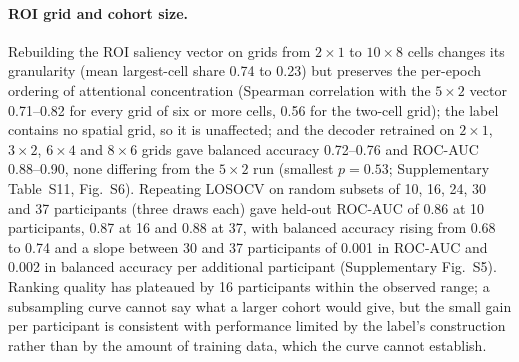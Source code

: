 \paragraph{ROI grid and cohort size.} Rebuilding the ROI saliency vector on grids from $2\times1$ to $10\times8$ cells changes its granularity (mean largest-cell share 0.74 to 0.23) but preserves the per-epoch ordering of attentional concentration (Spearman correlation with the $5\times2$ vector 0.71--0.82 for every grid of six or more cells, 0.56 for the two-cell grid); the label contains no spatial grid, so it is unaffected; and the decoder retrained on $2\times1$, $3\times2$, $6\times4$ and $8\times6$ grids gave balanced accuracy 0.72--0.76 and ROC-AUC 0.88--0.90, none differing from the $5\times2$ run (smallest $p=0.53$; Supplementary Table~S11, Fig.~S6). Repeating LOSOCV on random subsets of 10, 16, 24, 30 and 37 participants (three draws each) gave held-out ROC-AUC of 0.86 at 10 participants, 0.87 at 16 and 0.88 at 37, with balanced accuracy rising from 0.68 to 0.74 and a slope between 30 and 37 participants of 0.001 in ROC-AUC and 0.002 in balanced accuracy per additional participant (Supplementary Fig.~S5). Ranking quality has plateaued by 16 participants within the observed range; a subsampling curve cannot say what a larger cohort would give, but the small gain per participant is consistent with performance limited by the label's construction rather than by the amount of training data, which the curve cannot establish.
